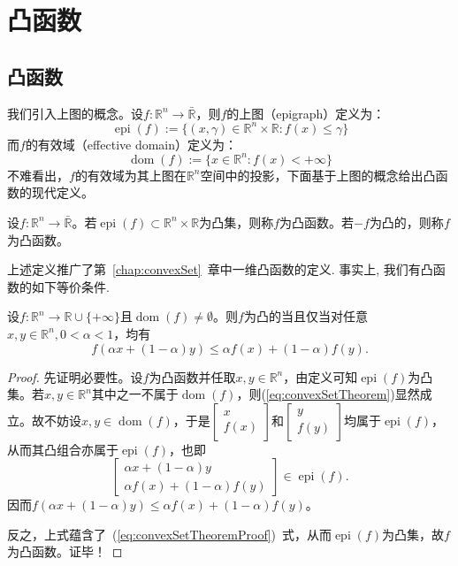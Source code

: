 \chapter{凸函数}
\section{凸函数}
我们引入上图的概念。设$f:\mathbb{R}^n\rightarrow \bar{\mathbb{R}}$，则$f$的上图（epigraph）定义为：
\[
    \operatorname{epi}(f):=\{ (x,\gamma)\in\mathbb{R}^{n}\times\mathbb{R}:f(x)\leq \gamma  \}
\]
而$f$的有效域（effective domain）定义为：
\[
    \operatorname{dom}(f):=\{ x\in\mathbb{R}^{n}:f(x)<+\infty \}
\]
不难看出，$f$的有效域为其上图在$\mathbb{R}^n$空间中的投影，下面基于上图的概念给出凸函数的现代定义。
\begin{definition}[凸函数]
    设$f:\mathbb{R}^n\rightarrow \bar{\mathbb{R}}$。若$\operatorname{epi}(f)\subset \mathbb{R}^n\times \mathbb{R}$为凸集，则称$f$为凸函数。若$-f$为凸的，则称$f$为凸函数。
\end{definition}
上述定义推广了第~\ref{chap:convexSet}~章中一维凸函数的定义. 事实上, 我们有凸函数的如下等价条件.
\begin{theorem}
    设$f:\mathbb{R}^{n}\to\mathbb{R}\cup\{+\infty\}$且$\operatorname{dom}(f)\neq \emptyset$。则$f$为凸的当且仅当对任意$x,y\in \mathbb{R}^n, 0<\alpha<1$，均有
    \begin{equation}\label{eq:convexSetTheorem}
        f(\alpha x+(1-\alpha)y)\leq\alpha f(x)+(1-\alpha)f(y).
    \end{equation}
\end{theorem}
\begin{proof}
    先证明必要性。设$f$为凸函数并任取$x,y\in \mathbb{R}^n$，由定义可知$\operatorname{epi}(f)$为凸集。若$x,y\in\mathbb{R}^n$其中之一不属于$\operatorname{dom}(f)$，则(\ref{eq:convexSetTheorem})显然成立。故不妨设$x,y\in\operatorname{dom}(f)$，于是$\left.\left[\begin{array}{c}x\\f(x)\end{array}\right.\right]$和$\left.\left[\begin{array}{c}y\\f(y)\end{array}\right.\right]$均属于$\operatorname{epi}(f)$，从而其凸组合亦属于$\operatorname{epi}(f)$，也即
    \begin{equation}\label{eq:convexSetTheoremProof}
        \left.\left[
            \begin{array}{c}
                \alpha x+(1-\alpha)y\\
                \alpha f(x)+(1-\alpha)f(y)
            \end{array}
            \right.\right]\in\operatorname{epi}(f).
    \end{equation}
    因而$f(\alpha x + (1-\alpha)y)\leq \alpha f(x) + (1-\alpha)f(y)$。
    
    反之，上式蕴含了~(\ref{eq:convexSetTheoremProof})~式，从而$\operatorname{epi}(f)$为凸集，故$f$为凸函数。证毕！
\end{proof}
